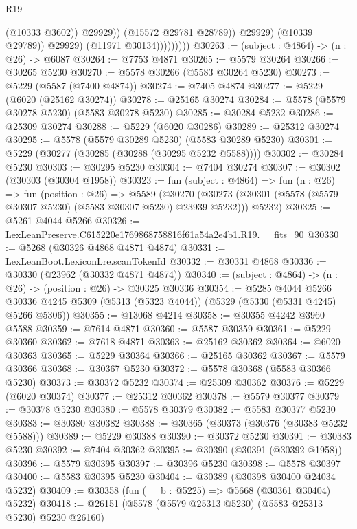 \begin{lexlean}{R19}
\begin{coremodule}
                                  (@10333 @3602))
                                @29929))
                            (@15572 @29781 @28789))
                          @29929)
                        (@10339 @29789))
                      @29929)
                    (@11971 @30134)))))))))
@30263 := (subject : @4864) -> (n : @26) -> @6087
@30264 := @7753 @4871
@30265 := @5579 @30264
@30266 := @30265 @5230
@30270 := @5578 @30266 (@5583 @30264 @5230)
@30273 := @5229 (@5587 (@7400 @4874))
@30274 := @7405 @4874
@30277 := @5229 (@6020 (@25162 @30274))
@30278 := @25165 @30274
@30284 := @5578 (@5579 @30278 @5230) (@5583 @30278 @5230)
@30285 := @30284 @5232
@30286 := @25309 @30274
@30288 := @5229 (@6020 @30286)
@30289 := @25312 @30274
@30295 := @5578 (@5579 @30289 @5230) (@5583 @30289 @5230)
@30301 := @5229 (@30277 (@30285 (@30288 (@30295 @5232 @5588))))
@30302 := @30284 @5230
@30303 := @30295 @5230
@30304 := @7404 @30274
@30307 := @30302 (@30303 (@30304 @1958))
@30323 := fun (subject : @4864) =>
  fun (n : @26) =>
  fun (position : @26) =>
  @5589
    (@30270 (@30273 (@30301 (@5578 (@5579 @30307 @5230) (@5583 @30307 @5230) @23939 @5232))) @5232)
@30325 := @5261 @4044 @5266
@30326 := LexLeanPreserve.C615220e1769868758816f61a54a2e4b1.R19.__fits_90
@30330 := @5268 (@30326 @4868 @4871 @4874)
@30331 := LexLeanBoot.LexiconLre.scanTokenId
@30332 := @30331 @4868
@30336 := @30330 (@23962 (@30332 @4871 @4874))
@30340 := (subject : @4864) -> (n : @26) -> (position : @26) -> @30325 @30336
@30354 := @5285
    @4044
    @5266
    @30336
    @4245
    @5309
    (@5313 (@5323 @4044))
    (@5329 (@5330 (@5331 @4245) @5266 @5306))
@30355 := @13068 @4214
@30358 := @30355 @4242 @3960 @5588
@30359 := @7614 @4871
@30360 := @5587 @30359
@30361 := @5229 @30360
@30362 := @7618 @4871
@30363 := @25162 @30362
@30364 := @6020 @30363
@30365 := @5229 @30364
@30366 := @25165 @30362
@30367 := @5579 @30366
@30368 := @30367 @5230
@30372 := @5578 @30368 (@5583 @30366 @5230)
@30373 := @30372 @5232
@30374 := @25309 @30362
@30376 := @5229 (@6020 @30374)
@30377 := @25312 @30362
@30378 := @5579 @30377
@30379 := @30378 @5230
@30380 := @5578 @30379
@30382 := @5583 @30377 @5230
@30383 := @30380 @30382
@30388 := @30365 (@30373 (@30376 (@30383 @5232 @5588)))
@30389 := @5229 @30388
@30390 := @30372 @5230
@30391 := @30383 @5230
@30392 := @7404 @30362
@30395 := @30390 (@30391 (@30392 @1958))
@30396 := @5579 @30395
@30397 := @30396 @5230
@30398 := @5578 @30397
@30400 := @5583 @30395 @5230
@30404 := @30389 (@30398 @30400 @24034 @5232)
@30409 := @30358 (fun (__b : @5225) => @5668 (@30361 @30404) @5232)
@30418 := @26151 (@5578 (@5579 @25313 @5230) (@5583 @25313 @5230) @5230 @26160)

\end{coremodule}
\end{lexlean}
